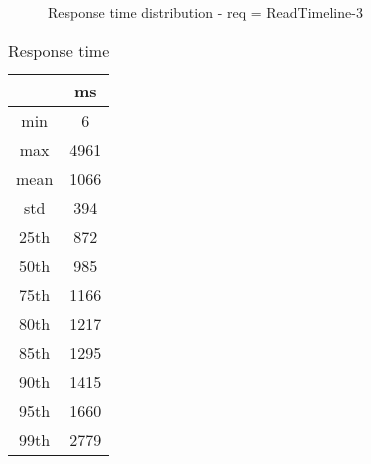 \begin{minipage}{0.75\linewidth}
\begin{figure}[h]
\begin{adjustbox}{max width=1.0\linewidth, keepaspectratio}
  \end{adjustbox}
  \caption{Response time distribution - req = ReadTimeline-3}
\end{figure}
\end{minipage}\hfill\begin{minipage}{0.18\linewidth}
\begin{table}[h]
\begin{tabular}{|cc|}
\hline
\textbf{} & \textbf{ms}\\ \hline
 \Xhline{0.005\arrayrulewidth}
min & 6\\
 \Xhline{0.005\arrayrulewidth}
max & 4961\\
 \Xhline{0.005\arrayrulewidth}
mean & 1066\\
 \Xhline{0.005\arrayrulewidth}
std & 394\\
\hline
\hline
 \Xhline{0.005\arrayrulewidth}
25th & 872\\
 \Xhline{0.005\arrayrulewidth}
50th & 985\\
 \Xhline{0.005\arrayrulewidth}
75th & 1166\\
 \Xhline{0.005\arrayrulewidth}
80th & 1217\\
 \Xhline{0.005\arrayrulewidth}
85th & 1295\\
 \Xhline{0.005\arrayrulewidth}
90th & 1415\\
 \Xhline{0.005\arrayrulewidth}
95th & 1660\\
 \Xhline{0.005\arrayrulewidth}
99th & 2779\\
\hline
\end{tabular}
\caption{Response time}
\end{table}
\end{minipage}\hfill